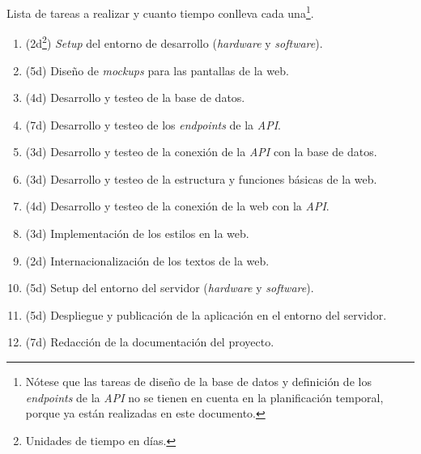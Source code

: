 \documentclass[12pt,a4paper,titlepage]{article}
\begin{document}

    Lista de tareas a realizar y cuanto tiempo conlleva cada una\footnote{Nótese que las tareas de diseño de la base de datos y definición de los \textit{endpoints} de la \textit{API} no se tienen en cuenta en la planificación temporal, porque ya están realizadas en este documento.}.

    \begin{enumerate}
        \renewcommand{\theenumi}{\Alph{enumi}} %
        \item (2d\footnote{Unidades de tiempo en días.}) \textit{Setup} del entorno de desarrollo (\textit{hardware} y \textit{software}).
        \item (5d) Diseño de \textit{mockups} para las pantallas de la web.
        \item (4d) Desarrollo y testeo de la base de datos.
        \item (7d) Desarrollo y testeo de los \textit{endpoints} de la \textit{API}.
        \item (3d) Desarrollo y testeo de la conexión de la \textit{API} con la base de datos.
        \item (3d) Desarrollo y testeo de la estructura y funciones básicas de la web.
        \item (4d) Desarrollo y testeo de la conexión de la web con la \textit{API}.
        \item (3d) Implementación de los estilos en la web.
        \item (2d) Internacionalización de los textos de la web.
        \item (5d) Setup del entorno del servidor (\textit{hardware} y \textit{software}).
        \item (5d) Despliegue y publicación de la aplicación en el entorno del servidor.
        \item (7d) Redacción de la documentación del proyecto.
    \end{enumerate}
\end{document}
